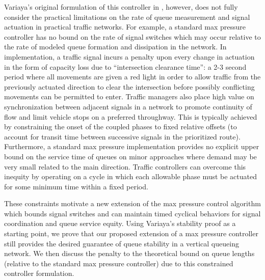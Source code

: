 Variaya's original formulation of this controller in \cite{MaxPressureStochastic}, however, does not fully consider the practical limitations on the rate of queue measurement and signal actuation in practical traffic networks. For example, a standard max pressure controller has no bound on the rate of signal switches which may occur relative to the rate of modeled queue formation and dissipation in the network. In implementation, a traffic signal incurs a penalty upon every change in actuation in the form of capacity loss due to ``intersection clearance time'': a 2-3 second period where all movements are given a red light in order to allow traffic from the previously actuated direction to clear the intersection before possibly conflicting movements can be permitted to enter. Traffic managers also place high value on synchronization between adjacent signals in a network to promote continuity of flow and limit vehicle stops on a preferred throughway. This is typically achieved by constraining the onset of the coupled phases to fixed relative offsets (to account for transit time between successive signals in the prioritized route). Furthermore, a standard max pressure implementation provides no explicit upper bound on the service time of queues on minor approaches where demand may be very small related to the main direction. Traffic controllers can overcome this inequity by operating on a cycle in which each allowable phase must be actuated for some minimum time within a fixed period.

These constraints motivate a new extension of the max pressure control algorithm which bounds signal switches and can maintain timed cyclical behaviors for signal coordination and queue service equity. Using Variaya's stability proof as a starting point, we prove that our proposed extension of a max pressure controller still provides the desired guarantee of queue stability in a vertical queueing network. We then discuss the penalty to the theoretical bound on queue lengths (relative to the standard max pressure controller) due to this constrained controller formulation. 


